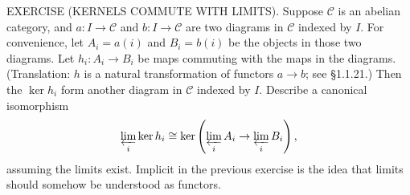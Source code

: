 EXERCISE (KERNELS COMMUTE WITH LIMITS). Suppose $\mathcal{C}$ is an abelian category, and $a:I\to\mathcal{C}$ and $b:I\to\mathcal{C}$ are two diagrams in $\mathcal{C}$ indexed by $I$. For convenience, let $A_i=a(i)$ and $B_i=b(i)$ be the objects in those two diagrams. Let $h_i:A_i\to B_i$ be maps commuting with the maps in the diagrams. (Translation: $h$ is a natural transformation of functors $a\to b$; see §1.1.21.) Then the $\ker h_i$ form another diagram in $\mathcal{C}$ indexed by $I$. Describe a canonical isomorphism
$$\varprojlim_i\ker h_i\cong\ker\left(\varprojlim_i A_i\to\varprojlim_i B_i\right),$$
assuming the limits exist. Implicit in the previous exercise is the idea that limits should somehow be understood as functors.
